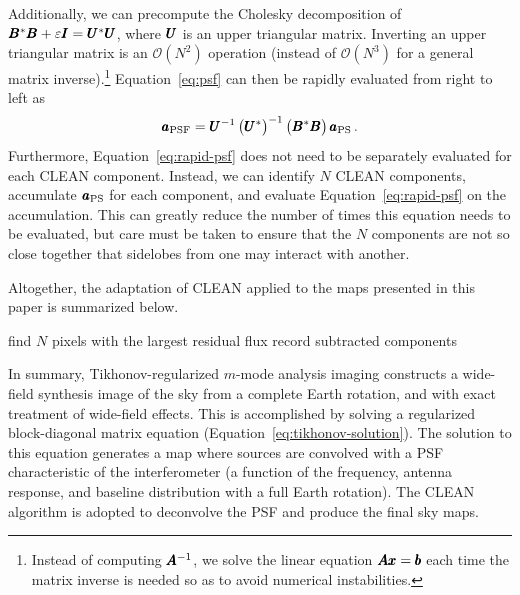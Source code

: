 \begin{bibunit}
Additionally, we can precompute the Cholesky decomposition of $\pmb B^*\pmb B + \varepsilon\pmb I = \pmb
U^*\pmb U$, where $\pmb U$ is an upper triangular matrix. Inverting an upper triangular matrix is an
$\mathcal{O}(N^2)$ operation (instead of $\mathcal{O}(N^3)$ for a general matrix inverse).\footnote{
    Instead of computing $\pmb A^{-1}$, we solve the linear equation $\pmb A\pmb x = \pmb b$ each time the
    matrix inverse is needed so as to avoid numerical instabilities.
}
Equation~\ref{eq:psf} can then be rapidly evaluated from right to left as
\begin{equation}\label{eq:rapid-psf}
    \pmb a_\text{PSF} =
        \pmb U^{-1}\,\big(\pmb U^*\big)^{-1}\,\big(\pmb B^*\pmb B\big)\,\pmb a_\text{PS}\,.
\end{equation}
Furthermore, Equation~\ref{eq:rapid-psf} does not need to be separately evaluated for each CLEAN
component. Instead, we can identify $N$ CLEAN components, accumulate $\pmb a_\text{PS}$ for each
component, and evaluate Equation~\ref{eq:rapid-psf} on the accumulation. This can greatly reduce the
number of times this equation needs to be evaluated, but care must be taken to ensure that the $N$
components are not so close together that sidelobes from one may interact with another.

Altogether, the adaptation of CLEAN applied to the maps presented in this paper is summarized below.
\begin{algorithmic}[1]
     
    \State find $N$ pixels with the largest residual flux
    \State record subtracted components
    \EndWhile
    \State {}
    \EndFunction
\end{algorithmic}

In summary, Tikhonov-regularized $m$-mode analysis imaging constructs a wide-field synthesis image of
the sky from a complete Earth rotation, and  with exact treatment of wide-field effects. This is
accomplished by solving a regularized block-diagonal matrix equation
(Equation~\ref{eq:tikhonov-solution}). The solution to this equation generates a map where
sources are convolved with a PSF characteristic of the interferometer (a function of the frequency,
antenna response, and baseline distribution with a full Earth rotation). The CLEAN algorithm is
adopted to deconvolve the PSF and produce the final sky maps.


\end{bibunit}
